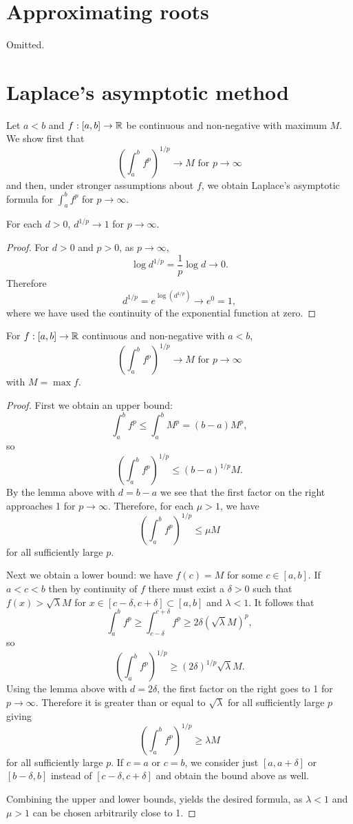 \documentclass{mathnotes}
\begin{document}
\section{Approximating roots}

Omitted.

\section{Laplace's asymptotic method}

Let $a<b$ and $f:[a,b]\to\mathbb{R}$ be continuous and non-negative with maximum $M$. We show first that
\[\left( \int^b_af^p \right)^{1/p}\to M\text{ for }p\to\infty\]
and then, under stronger assumptions about $f$, we obtain Laplace's asymptotic formula for $\int^b_af^p$ for $p\to\infty$.

\begin{lem}
    For each $d>0$, $d^{1/p}\to 1$ for $p\to\infty$.
\end{lem}
\begin{proof}
    For $d>0$ and $p>0$, as $p\to \infty$,
    \[\log d^{1/p}=\frac{1}{p}\log d\to 0.\]
    Therefore
    \[d^{1/p}=e^{\log(d^{1/p})}\to e^0=1,\]
    where we have used the continuity of the exponential function at zero.
\end{proof}

\begin{thm}
For $f:[a,b]\to\mathbb{R}$ continuous and non-negative with $a<b$, 
\begin{equation}
    \left( \int^b_af^p \right)^{1/p}\to M\text{ for }p\to\infty
    \label{eq:lap1}
\end{equation}
with $M=\max f$.
\end{thm}
\begin{proof}
    First we obtain an upper bound:
    \[\int_a^b f^p\leq \int_a^bM^p=(b-a)M^p,\]
    so
    \[\left( \int_a^bf^p \right)^{1/p}\leq (b-a)^{1/p}M.\]
    By the lemma above with $d=b-a$ we see that the first factor on the right approaches 1 for $p\to\infty$.
    Therefore, for each $\mu>1$, we have
    \[\left( \int_a^bf^p \right)^{1/p}\leq\mu M\]
    for all sufficiently large $p$.

    Next we obtain a lower bound: we have $f(c)=M$ for some $c\in[a,b]$. If $a<c<b$ then by continuity
    of $f$ there must exist a $\delta>0$ such that $f(x)>\sqrt{\lambda}M$ for $x\in[c-\delta,c+\delta]\subset[a,b]$
    and $\lambda<1$.
    It follows that
    \[\int_a^bf^p\geq \int_{c-\delta}^{c+\delta}f^p\geq 2\delta(\sqrt{\lambda}M)^p,\]
    so
    \[\left( \int_a^bf^p \right)^{1/p}\geq (2\delta)^{1/p}\sqrt{\lambda}M.\]
    Using the lemma above with $d=2\delta$, the first factor on the right goes to 1 for $p\to\infty$.
    Therefore it is greater than or equal to $\sqrt{\lambda}$ for all sufficiently large $p$ giving
    \[\left( \int_a^b f^p \right)^{1/p}\geq \lambda M\]
    for all sufficiently large $p$. If $c=a$ or $c=b$, we consider just $[a,a+\delta]$ or $[b-\delta,b]$
    instead of $[c-\delta,c+\delta]$ and obtain the bound above as well.

    Combining the upper and lower bounds, yields the desired formula, as $\lambda<1$ and $\mu>1$ can
    be chosen arbitrarily close to 1.
\end{proof}
\end{document}
